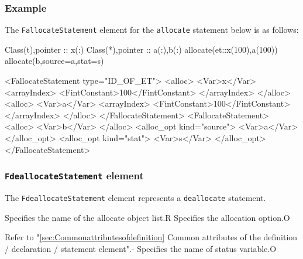 \subsubsection*{Example}

The {\tt FallocateStatement} element for the {\tt allocate} statement below is as follows:
\vspace{2mm}

\begin{Fexample2008}
Class(t),pointer :: x(:)
Class(*),pointer :: a(:),b(:)
allocate(et::x(100),a(100))
allocate(b,source=a,stat=s)
\end{Fexample2008}
\vspace{1mm}

\begin{XcodeMLFExample}
<FallocateStatement type="ID_OF_ET">
  <alloc>
    <Var>x</Var>
    <arrayIndex>
      <FintConstant>100</FintConstant>
    </arrayIndex>
  </alloc>
  <alloc>
     <Var>a</Var>
     <arrayIndex>
       <FintConstant>100</FintConstant>
     </arrayIndex>
   </alloc>
</FallocateStatement>
<FallocateStatement>
  <alloc>
    <Var>b</Var>
  </alloc>
  <alloc\_opt kind="source">
     <Var>a</Var>
  </alloc\_opt>
  <alloc\_opt kind="stat">
     <Var>s</Var>
  </alloc\_opt>
</FallocateStatement>
\end{XcodeMLFExample}


\subsubsection{ {\tt FdeallocateStatement} element}

The {\tt FdeallocateStatement} element represents a {\tt deallocate} statement.


\begin{XcodeMLChildElements}
{Specifies the name of the allocate object list.}{R}
{Specifies the allocation option.}{O}
\end{XcodeMLChildElements}

\begin{XcodeMLAttributes}
{Refer to "\ref{sec:Commonattributesofdefinition} Common attributes of the definition / declaration / statement element".}{-}
{Specifies the name of status variable.}{O}
\end{XcodeMLAttributes}


